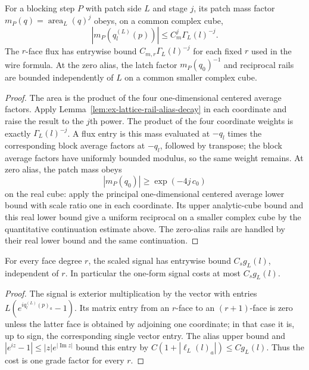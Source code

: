 \begin{lemma}
\label{lem:ex-lattice-mass-flux-weight}
For a blocking step $P$ with patch side $L$ and stage $j$, its patch mass factor
$m_P(q)=\operatorname{area}_{L}(q)^j$ obeys, on a common complex cube,
\[
 |m_P(q_l^{(L)}(p))|\leq C_m^j\Gamma_L(l)^{-j}.
\]
The $r$-face flux has entrywise bound
$C_{m,r}\Gamma_L(l)^{-j}$ for each fixed $r$ used in the wire formula.
At the zero alias, the latch factor $m_P(q_0)^{-1}$ and reciprocal rails
are bounded independently of $L$ on a common smaller complex cube.
\end{lemma}

\begin{proof}
The area is the product of the four one-dimensional centered average factors. Apply
Lemma~\ref{lem:ex-lattice-rail-alias-decay} in each coordinate and raise
the result to the $j$th power. The product of the four coordinate weights
is exactly $\Gamma_L(l)^{-j}$. A flux entry is this mass evaluated at
$-q_l$ times the corresponding block average factors at $-q_l$, followed by
transpose; the block average factors have uniformly bounded modulus, so the same
weight remains. At zero alias, the patch mass obeys
\[
 |m_P(q_0)|\geq \exp(-4j\,c_0)
\]
on the real cube: apply the principal one-dimensional centered average lower bound
with scale ratio one in each coordinate. Its upper analytic-cube bound
and this real lower bound give a uniform reciprocal on a smaller complex
cube by the quantitative continuation estimate above. The zero-alias
rails are handled by their real lower bound and the same continuation.
\end{proof}

\begin{lemma}
\label{lem:ex-lattice-scaled-signal-weight}
For every face degree $r$, the scaled signal has entrywise bound
$C_sg_L(l)$, independent of $r$. In particular the one-form signal costs
at most $C_sg_L(l)$.
\end{lemma}

\begin{proof}
The signal is exterior multiplication by the vector with entries
$L(e^{iq_l^{(L)}(p)_a}-1)$. Its matrix entry from an $r$-face to an
$(r+1)$-face is zero unless the latter face is obtained by adjoining one
coordinate; in that case it is, up to sign, the corresponding single vector
entry. The alias upper bound and $|e^{iz}-1|\leq |z|e^{|\operatorname{Im}z|}$
bound this entry by $C(1+|\ell_L(l)_a|)\leq Cg_L(l)$. Thus the cost is one
grade factor for every $r$.
\end{proof}

